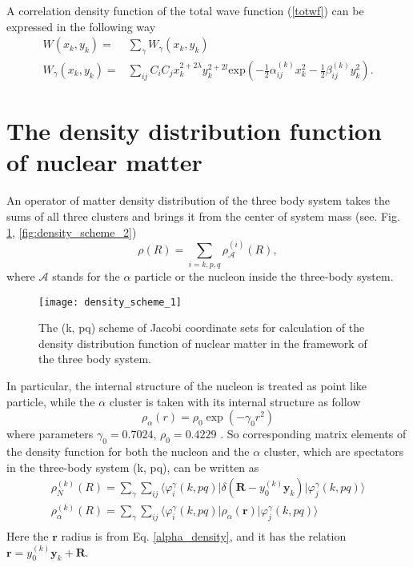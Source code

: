 \documentclass[
12pt, %
oneside, %
english, %
onehalfspacing, %
onehalfspacing, %
headsepline, %
]{MastersDoctoralThesis} %
\begin{document}
A correlation density function of the total wave function (\ref{totwf})  can be expressed in the following way
\begin{align}
W\left( x_k,y_k \right) =& \sum_{\gamma} W_{\gamma}\left( x_k,y_k \right) \nonumber \\
W_{\gamma}\left( x_k,y_k \right) =& \sum_{ij} C_i C_j x^{2+2\lambda}_k y^{2+2l}_k \text{exp}\left( - \tfrac{1}{2} \alpha^{(k)}_{ij} x_k^2 -  \tfrac{1}{2} \beta^{(k)}_{ij} y_k^2 \right) .
\end{align}

\section{The density distribution function of nuclear matter}

An operator of matter density distribution of the three body system takes the sums of all three clusters and brings it from the center of  system mass (see. Fig. \ref{fig:density_scheme_1}, \ref{fig:density_scheme_2})
\begin{equation}
\rho({R})=\sum_{\scriptscriptstyle{i}=k,p,q} \rho^{(i)}_{\mathcal{A}}({R}),
\end{equation}
where $\mathcal{A}$ stands for the $\alpha$ particle or the nucleon inside the three-body system.

\begin{figure}[b]
\centering
\texttt{[image: density\_scheme\_1]}
\decoRule
\caption{\footnotesize The (k, pq) scheme of Jacobi coordinate sets for calculation of the density distribution function of nuclear matter in the framework of  the three body system.}
\label{fig:density_scheme_1}
\end{figure}

In particular,  the internal structure of the nucleon is treated as point like particle, while the $\alpha$ cluster  is taken  with its internal structure as follow
\begin{equation}
\rho_\alpha(r)=\rho_0 \exp\left(-\gamma_0 r^2 \right)
\label{alpha_density}
\end{equation}
 where parameters $ \gamma_0= 0.7024$, $  \displaystyle \rho_0=0.4229$ \cite{satchler1979folding}. So corresponding matrix elements of the density function for both the nucleon and the $\alpha$ cluster, which are spectators in the three-body system (k, pq), can be written as 
\begin{equation}
\label{densities}
\begin{gathered}
\rho_{N}^{(k)}({R})=
\sum_{\gamma}
\sum_{ij}
\langle\varphi^{{\gamma}}_i(k, pq) 
\vert \delta(\textbf{R}-y_0^{(k)}\textbf{y}_k)
\vert \varphi^{{\gamma}}_j(k, pq)\rangle \\
\rho_{\alpha}^{(k)}({R})= 
\sum_{\gamma}
\sum_{ij}
\langle\varphi^{{\gamma}}_i(k, pq) 
\vert \rho_{\alpha}(\textbf{r}) 
\vert \varphi^{{\gamma}}_j(k, pq)\rangle \\
\end{gathered}
\end{equation}
Here the $\textbf{r}$ radius is from Eq. \ref{alpha_density}, and it has the relation  $\textbf{r}=y_0^{(k)}\textbf{y}_k+\textbf{R}$.
\end{document}
